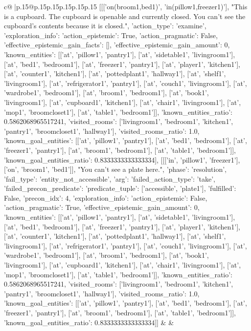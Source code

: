 \documentclass{article}
\begin{document}
{\begin{supertabular}{c@{$\;$}|p{.15\linewidth}@{}p{.15\linewidth}p{.15\linewidth}p{.15\linewidth}p{.15\linewidth}p{.15\linewidth}}
{{{	 [[['on(broom1,bed1)', 'in(pillow1,freezer1)'], "This is a cupboard. The cupboard is openable and currently closed. You can't see the cupboard's contents because it is closed.", {'action_type': 'examine', 'exploration_info': {'action_epistemic': True, 'action_pragmatic': False, 'effective_epistemic_gain_facts': [], 'effective_epistemic_gain_amount': 0, 'known_entities': [['at', 'pillow1', 'pantry1'], ['at', 'sidetable1', 'livingroom1'], ['at', 'bed1', 'bedroom1'], ['at', 'freezer1', 'pantry1'], ['at', 'player1', 'kitchen1'], ['at', 'counter1', 'kitchen1'], ['at', 'pottedplant1', 'hallway1'], ['at', 'shelf1', 'livingroom1'], ['at', 'refrigerator1', 'pantry1'], ['at', 'couch1', 'livingroom1'], ['at', 'wardrobe1', 'bedroom1'], ['at', 'broom1', 'bedroom1'], ['at', 'book1', 'livingroom1'], ['at', 'cupboard1', 'kitchen1'], ['at', 'chair1', 'livingroom1'], ['at', 'mop1', 'broomcloset1'], ['at', 'table1', 'bedroom1']], 'known_entities_ratio': 0.5862068965517241, 'visited_rooms': ['livingroom1', 'bedroom1', 'kitchen1', 'pantry1', 'broomcloset1', 'hallway1'], 'visited_rooms_ratio': 1.0, 'known_goal_entities': [['at', 'pillow1', 'pantry1'], ['at', 'bed1', 'bedroom1'], ['at', 'freezer1', 'pantry1'], ['at', 'broom1', 'bedroom1'], ['at', 'table1', 'bedroom1']], 'known_goal_entities_ratio': 0.8333333333333334}}], [[['in', 'pillow1', 'freezer1'], ['on', 'broom1', 'bed1']], "You can't see a plate here.", {'phase': 'resolution', 'fail_type': 'entity_not_accessible', 'arg': {'failed_action_type': 'take', 'failed_precon_predicate': {'predicate_tuple': ['accessible', 'plate1'], 'fulfilled': False, 'precon_idx': 4}}, 'exploration_info': {'action_epistemic': False, 'action_pragmatic': True, 'effective_epistemic_gain_amount': 0, 'known_entities': [['at', 'pillow1', 'pantry1'], ['at', 'sidetable1', 'livingroom1'], ['at', 'bed1', 'bedroom1'], ['at', 'freezer1', 'pantry1'], ['at', 'player1', 'kitchen1'], ['at', 'counter1', 'kitchen1'], ['at', 'pottedplant1', 'hallway1'], ['at', 'shelf1', 'livingroom1'], ['at', 'refrigerator1', 'pantry1'], ['at', 'couch1', 'livingroom1'], ['at', 'wardrobe1', 'bedroom1'], ['at', 'broom1', 'bedroom1'], ['at', 'book1', 'livingroom1'], ['at', 'cupboard1', 'kitchen1'], ['at', 'chair1', 'livingroom1'], ['at', 'mop1', 'broomcloset1'], ['at', 'table1', 'bedroom1']], 'known_entities_ratio': 0.5862068965517241, 'visited_rooms': ['livingroom1', 'bedroom1', 'kitchen1', 'pantry1', 'broomcloset1', 'hallway1'], 'visited_rooms_ratio': 1.0, 'known_goal_entities': [['at', 'pillow1', 'pantry1'], ['at', 'bed1', 'bedroom1'], ['at', 'freezer1', 'pantry1'], ['at', 'broom1', 'bedroom1'], ['at', 'table1', 'bedroom1']], 'known_goal_entities_ratio': 0.8333333333333334}}]] 
	  } 
	   } 
	   } 
	 & & \\ 
 


\end{supertabular}}
\end{document}
